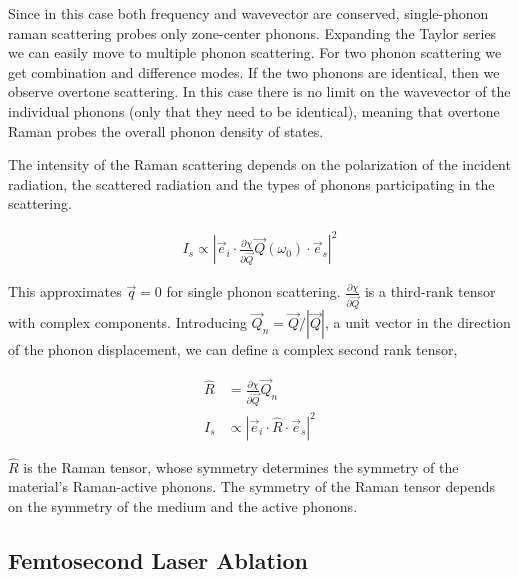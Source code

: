     Since in this case both frequency and wavevector are conserved, single-phonon raman scattering probes only zone-center phonons.
    Expanding the Taylor series we can easily move to multiple phonon scattering. For two phonon scattering we get combination
    and difference modes. If the two phonons are identical, then we observe overtone scattering. In this case there is no limit
    on the wavevector of the individual phonons (only that they need to be identical), meaning that overtone Raman probes the
    overall phonon density of states.

    The intensity of the Raman scattering depends on the polarization of the incident radiation, the scattered radiation and the
    types of phonons participating in the scattering.

    \begin{align}
        I_s \propto | \vec{e}_i \cdot \frac{\partial\chi}{\partial\vec{Q}}\vec{Q}(\omega_0)\cdot\vec{e}_s|^2
    \end{align}

    This approximates $\vec{q} = 0$ for single phonon scattering. $\frac{\partial\chi}{\partial\vec{Q}}$ is a third-rank tensor with
    complex components. Introducing $\vec{Q}_n = \vec{Q}/|\vec{Q}|$, a unit vector in the direction of the phonon displacement, we can
    define a complex second rank tensor,

    \begin{align}
        \hat{R} &= \frac{\partial\chi}{\partial\vec{Q}}\vec{Q}_n \\
        I_s &\propto | \vec{e}_i \cdot \hat{R} \cdot\vec{e}_s|^2
    \end{align}

    $\hat{R}$ is the Raman tensor, whose symmetry determines the symmetry of the material's Raman-active phonons. The symmetry of the
    Raman tensor depends on the symmetry of the medium and the active phonons.

\clearpage

\subsection{Femtosecond Laser Ablation}
\label{ap:Ablation}

